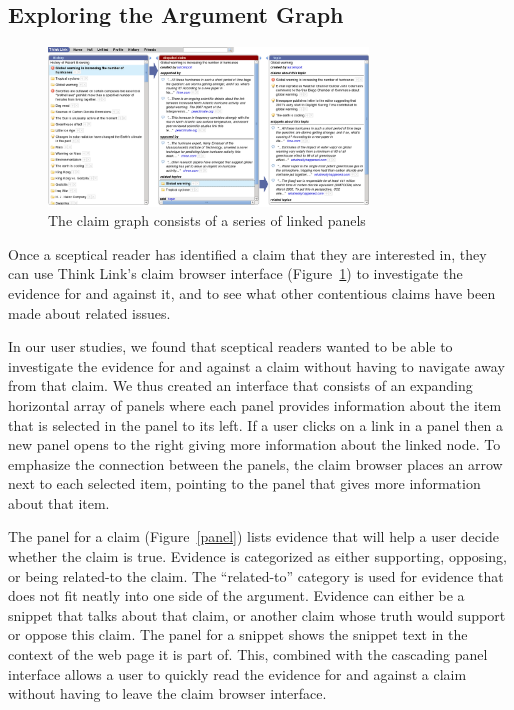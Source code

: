 \documentclass{chi2009}
\newcommand{\todo}[1]{}
\begin{document}
\todo{ignore button}
\todo{talk about the margin?}
\todo{Talk about snippet and topic previewing}

\subsection{Exploring the Argument Graph}

\begin{figure}[tb]
	\begin{center}
	\includegraphics[width=8.5cm]{../screenshots/v2_panels.png}
	\caption{The claim graph consists of a series of linked panels}
	\label{panels}
	\end{center}
\end{figure}

Once a sceptical reader has identified a claim that they are interested in, they can use Think Link's claim browser interface (Figure~\ref{panels}) to investigate the evidence for and against it, and to see what other contentious claims have been made about related issues. 

In our user studies, we found that sceptical readers wanted to be able to investigate the evidence for and against a claim without having to navigate away from that claim. We thus created an interface that consists of an expanding horizontal array of panels where each panel provides information about the item that is selected in the panel to its left. If a user clicks on a link in a panel then a new panel opens to the right giving more information about the linked node. To emphasize the connection between the panels, the claim browser places an arrow next to each selected item, pointing to the panel that gives more information about that item.

The panel for a claim (Figure~\ref{panel}) lists evidence that will help a user decide whether the claim is true. Evidence is categorized as either supporting, opposing, or being related-to the claim. The ``related-to'' category is used for evidence that does not fit neatly into one side of the argument. Evidence can either be a snippet that talks about that claim, or another claim whose truth would support or oppose this claim.  The panel for a snippet shows the snippet text in the context of the web page it is part of. This, combined with the cascading panel interface allows a user to quickly read the evidence for and against a claim without having to leave the claim browser interface.
\end{document}
